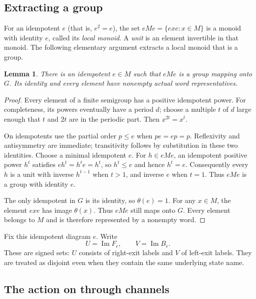 \documentclass[11pt,a4paper]{article}
\newtheorem{lemma}[theorem]{Lemma}
\theoremstyle{definition}
\theoremstyle{remark}
\newcommand{\im}{\operatorname{Im}}
\begin{document}
\subsection{Extracting a group}

For an idempotent $e$ (that is, $e^2=e$), the set
$eMe=\{exe:x\in M\}$ is a monoid with identity $e$, called its
\emph{local monoid}. A \emph{unit} is an element invertible in that
monoid. The following elementary argument extracts a local monoid
that is a group.

\begin{lemma}\label{lem:group-extraction}
There is an idempotent $e\in M$ such that $eMe$ is a group mapping
onto $G$. Its identity and every element have nonempty actual
word representatives.
\end{lemma}
\begin{proof}
Every element of a finite semigroup has a positive idempotent power.
For completeness, its powers eventually have a period $d$; choose
a multiple $t$ of $d$ large enough that $t$ and $2t$ are in the
periodic part. Then $x^{2t}=x^t$.

On idempotents use the partial order $p\le e$ when $pe=ep=p$.
Reflexivity and antisymmetry are immediate; transitivity follows by
substitution in these two identities. Choose a minimal idempotent
$e$. For $h\in eMe$, an idempotent positive power $h^t$ satisfies
$eh^t=h^te=h^t$, so $h^t\le e$ and hence $h^t=e$. Consequently
every $h$ is a unit with inverse $h^{t-1}$ when $t>1$, and inverse
$e$ when $t=1$. Thus $eMe$ is a group with identity $e$.

The only idempotent in $G$ is its identity, so $\theta(e)=1$.
For any $x\in M$, the element $exe$ has image $\theta(x)$.
Thus $eMe$ still maps onto $G$. Every element belongs to $M$ and
is therefore represented by a nonempty word.
\end{proof}

Fix this idempotent diagram $e$. Write
\begin{equation}\label{eq:channels}
                    U=\im F_e,\qquad V=\im B_e.
\end{equation}
These are signed sets: $U$ consists of right-exit labels and $V$
of left-exit labels. They are treated as disjoint even when they
contain the same underlying state name.

\subsection{The action on through channels}
\end{document}

